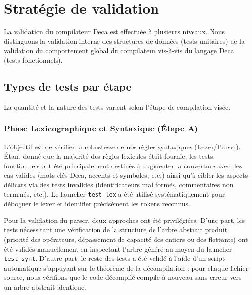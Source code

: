\section{Stratégie de validation}
\noindent
La validation du compilateur Deca est effectuée à plusieurs niveaux. Nous distinguons la validation interne des structures de données (tests unitaires) de la validation du comportement global du compilateur vis-à-vis du langage Deca (tests fonctionnels).

\subsection{Types de tests par étape}
\noindent
La quantité et la nature des tests varient selon l'étape de compilation visée.

\subsubsection{Phase Lexicographique et Syntaxique (Étape A)} 
\noindent L'objectif est de vérifier la robustesse de nos règles syntaxiques (Lexer/Parser). Étant donné que la majorité des règles lexicales était fournie, les tests fonctionnels ont été principalement destinés à augmenter la couverture avec des cas valides (mots-clés Deca, accents et symboles, etc.) ainsi qu'à cibler les aspects délicats via des tests invalides (identificateurs mal formés, commentaires non terminés, etc.). Le launcher \texttt{test\_lex} a été utilisé systématiquement pour déboguer le lexer et identifier précisément les tokens reconnus.

\noindent Pour la validation du parser, deux approches ont été privilégiées. D'une part, les tests nécessitant une vérification de la structure de l'arbre abstrait produit (priorité des opérateurs, dépassement de capacité des entiers ou des flottants) ont été validés manuellement en inspectant l'arbre généré au moyen du launcher \texttt{test\_synt}. D'autre part, le reste des tests a été validé à l'aide d'un script automatique s'appuyant sur le théorème de la décompilation : pour chaque fichier source, nous vérifions que le code décompilé compile à nouveau sans erreur vers un arbre abstrait identique.



